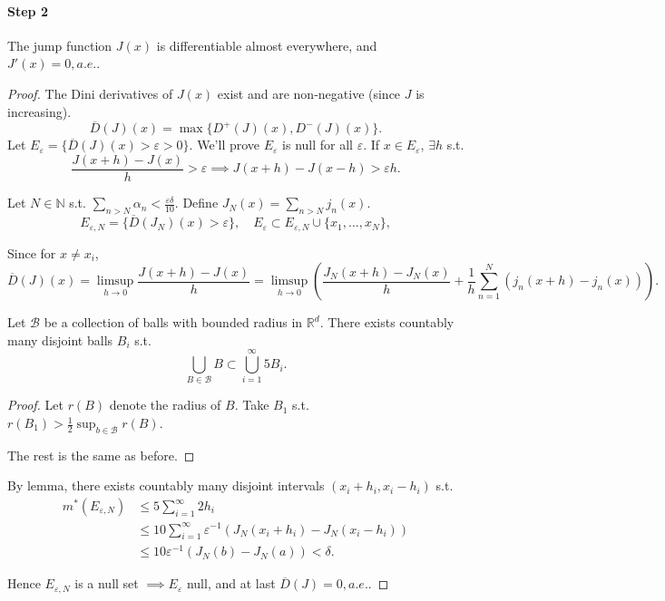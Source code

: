 \paragraph{Step 2}

\begin{proposition}
	The jump function $J(x)$ is differentiable almost everywhere, and $J'(x)=0, a.e.$.
\end{proposition}
\begin{proof}[Proof]
    The Dini derivatives of $J(x)$ exist and are non-negative (since $J$ is increasing).
	\[
	\overline{D}(J)(x) = \max\{D^+(J)(x), D^-(J)(x)\}.
	\]
	Let $E_\varepsilon = \{\overline{D}(J)(x) > \varepsilon > 0\}$.
	We'll prove $E_\varepsilon$ is null for all $\varepsilon$.
	If $x\in E_\varepsilon$,  $\exists h$ s.t.
	\[
		\frac{J(x+h) - J(x)}{h}>\varepsilon \implies J(x+h)-J(x-h) > \varepsilon h.
	\]

	Let $N\in \mathbb{N}$ s.t. $\sum_{n>N}\alpha_n < \frac{\varepsilon\delta}{10}$.
	Define $J_N(x) = \sum_{n>N} j_n(x)$.
	\[
	E_{\varepsilon, N} = \{\overline{D}(J_N)(x) > \varepsilon\},\quad
	E_\varepsilon \subset E_{\varepsilon, N}\cup \{x_1,\dots,x_N\},
	\]

	Since for $x\ne x_i$,
	\[
	\overline{D}(J)(x) = \limsup_{h\to 0} \frac{J(x+h)-J(x)}{h}
	= \limsup_{h\to 0} \left( \frac{J_N(x+h)-J_N(x)}{h} + \frac{1}{h}
	\sum_{n=1}^{N} (j_n(x+h) - j_n(x))\right).
	\]

	\begin{lemma}
		Let $\mathcal{B}$ be a collection of balls with bounded radius in $\mathbb{R}^{d}$.
		There exists countably many disjoint balls $B_i$ s.t.
		\[
		\bigcup_{B\in \mathcal{B}} B \subset\bigcup_{i=1}^\infty 5B_i.
		\]
	\end{lemma}
	\begin{proof}[Proof]
		Let $r(B)$ denote the radius of $B$.
		Take $B_1$ s.t. $r(B_1)>\frac{1}{2} \sup_{b\in \mathcal{B}}r(B)$.

		The rest is the same as before.
	\end{proof}

	By lemma, there exists countably many disjoint intervals
	$(x_i+h_i, x_i-h_i)$ s.t.
	\begin{align*}
	m^*(E_{\varepsilon,N})&\le 5 \sum_{i=1}^{\infty}2h_i\\
	&\le 10 \sum_{i=1}^{\infty} \varepsilon^{-1}(J_N(x_i+h_i)-J_N(x_i-h_i))\\
	&\le 10 \varepsilon^{-1} (J_N(b)-J_N(a)) < \delta.
	\end{align*}

	Hence $E_{\varepsilon, N}$ is a null set $ \implies E_\varepsilon$ null,
	and at last $\overline{D}(J) = 0, a.e.$.
\end{proof}

